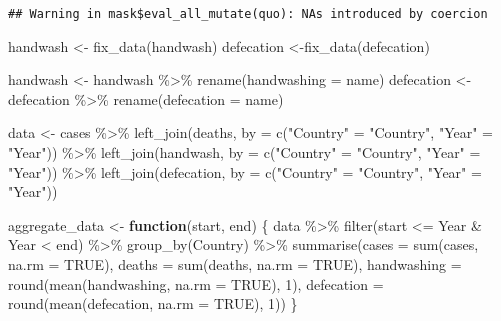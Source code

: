 \documentclass[
]{article}
\newenvironment{Shaded}{\begin{snugshade}}{\end{snugshade}}
\newcommand{\AttributeTok}[1]{\textcolor[rgb]{0.77,0.63,0.00}{#1}}
\newcommand{\ConstantTok}[1]{\textcolor[rgb]{0.00,0.00,0.00}{#1}}
\newcommand{\ControlFlowTok}[1]{\textcolor[rgb]{0.13,0.29,0.53}{\textbf{#1}}}
\newcommand{\DecValTok}[1]{\textcolor[rgb]{0.00,0.00,0.81}{#1}}
\newcommand{\FunctionTok}[1]{\textcolor[rgb]{0.00,0.00,0.00}{#1}}
\newcommand{\NormalTok}[1]{#1}
\newcommand{\OtherTok}[1]{\textcolor[rgb]{0.56,0.35,0.01}{#1}}
\newcommand{\SpecialCharTok}[1]{\textcolor[rgb]{0.00,0.00,0.00}{#1}}
\newcommand{\StringTok}[1]{\textcolor[rgb]{0.31,0.60,0.02}{#1}}
\begin{document}
\begin{verbatim}
## Warning in mask$eval_all_mutate(quo): NAs introduced by coercion
\end{verbatim}

\begin{Shaded}
\begin{Highlighting}[]
\NormalTok{handwash }\OtherTok{\textless{}{-}} \FunctionTok{fix\_data}\NormalTok{(handwash)}
\NormalTok{defecation }\OtherTok{\textless{}{-}}\FunctionTok{fix\_data}\NormalTok{(defecation)}

\NormalTok{handwash }\OtherTok{\textless{}{-}}\NormalTok{ handwash }\SpecialCharTok{\%\textgreater{}\%} \FunctionTok{rename}\NormalTok{(}\AttributeTok{handwashing =}\NormalTok{ name)}
\NormalTok{defecation }\OtherTok{\textless{}{-}}\NormalTok{ defecation }\SpecialCharTok{\%\textgreater{}\%} \FunctionTok{rename}\NormalTok{(}\AttributeTok{defecation =}\NormalTok{ name)}


\NormalTok{data }\OtherTok{\textless{}{-}}\NormalTok{ cases }\SpecialCharTok{\%\textgreater{}\%}
  \FunctionTok{left\_join}\NormalTok{(deaths, }\AttributeTok{by =} \FunctionTok{c}\NormalTok{(}\StringTok{"Country"} \OtherTok{=} \StringTok{"Country"}\NormalTok{, }\StringTok{"Year"} \OtherTok{=} \StringTok{"Year"}\NormalTok{)) }\SpecialCharTok{\%\textgreater{}\%}
  \FunctionTok{left\_join}\NormalTok{(handwash, }\AttributeTok{by =} \FunctionTok{c}\NormalTok{(}\StringTok{"Country"} \OtherTok{=} \StringTok{"Country"}\NormalTok{, }\StringTok{"Year"} \OtherTok{=} \StringTok{"Year"}\NormalTok{)) }\SpecialCharTok{\%\textgreater{}\%}
  \FunctionTok{left\_join}\NormalTok{(defecation, }\AttributeTok{by =} \FunctionTok{c}\NormalTok{(}\StringTok{"Country"} \OtherTok{=} \StringTok{"Country"}\NormalTok{, }\StringTok{"Year"} \OtherTok{=} \StringTok{"Year"}\NormalTok{))}

\NormalTok{aggregate\_data }\OtherTok{\textless{}{-}} \ControlFlowTok{function}\NormalTok{(start, end) \{}
\NormalTok{  data }\SpecialCharTok{\%\textgreater{}\%}
    \FunctionTok{filter}\NormalTok{(start }\SpecialCharTok{\textless{}=}\NormalTok{ Year }\SpecialCharTok{\&}\NormalTok{ Year }\SpecialCharTok{\textless{}}\NormalTok{ end) }\SpecialCharTok{\%\textgreater{}\%}
    \FunctionTok{group\_by}\NormalTok{(Country) }\SpecialCharTok{\%\textgreater{}\%}
    \FunctionTok{summarise}\NormalTok{(}\AttributeTok{cases =} \FunctionTok{sum}\NormalTok{(cases, }\AttributeTok{na.rm =} \ConstantTok{TRUE}\NormalTok{), }\AttributeTok{deaths =} \FunctionTok{sum}\NormalTok{(deaths, }\AttributeTok{na.rm =} \ConstantTok{TRUE}\NormalTok{),}
              \AttributeTok{handwashing =} \FunctionTok{round}\NormalTok{(}\FunctionTok{mean}\NormalTok{(handwashing, }\AttributeTok{na.rm =} \ConstantTok{TRUE}\NormalTok{), }\DecValTok{1}\NormalTok{),}
              \AttributeTok{defecation =} \FunctionTok{round}\NormalTok{(}\FunctionTok{mean}\NormalTok{(defecation, }\AttributeTok{na.rm =} \ConstantTok{TRUE}\NormalTok{), }\DecValTok{1}\NormalTok{))}
\NormalTok{\}}
\end{Highlighting}
\end{Shaded}
\end{document}
